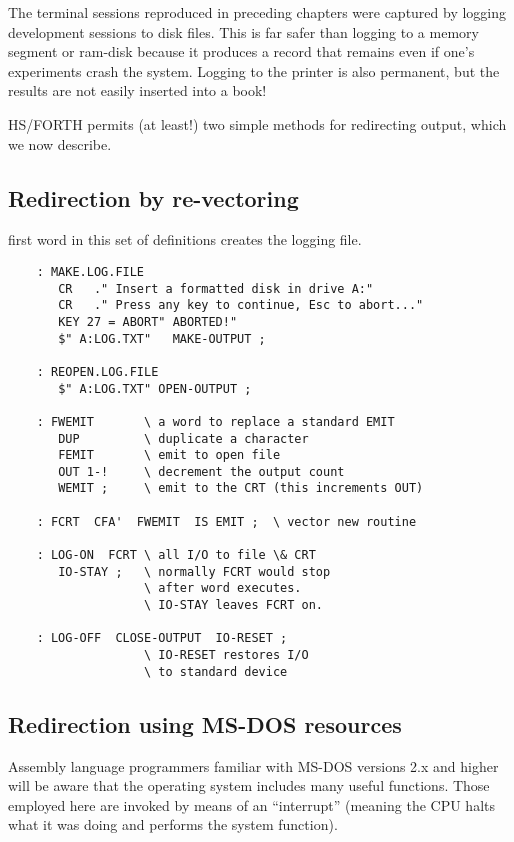 The terminal sessions reproduced in preceding chapters were captured by logging development sessions to disk files. This is far safer than logging to a memory segment or ram-disk because it produces a record that remains even if one’s experiments crash the system. Logging to the printer is also permanent, but the results are not easily inserted into a book!

HS/FORTH permits (at least!) two simple methods for redirecting output, which we now describe.

\subsection{Redirection by re-vectoring}
 first word in this set of definitions creates the logging file.

\begin{lstlisting}
    : MAKE.LOG.FILE
       CR   ." Insert a formatted disk in drive A:"
       CR   ." Press any key to continue, Esc to abort..."
       KEY 27 = ABORT" ABORTED!"
       $" A:LOG.TXT"   MAKE-OUTPUT ;

    : REOPEN.LOG.FILE
       $" A:LOG.TXT" OPEN-OUTPUT ;

    : FWEMIT       \ a word to replace a standard EMIT
       DUP         \ duplicate a character
       FEMIT       \ emit to open file
       OUT 1-!     \ decrement the output count
       WEMIT ;     \ emit to the CRT (this increments OUT)

    : FCRT  CFA'  FWEMIT  IS EMIT ;  \ vector new routine

    : LOG-ON  FCRT \ all I/O to file \& CRT
       IO-STAY ;   \ normally FCRT would stop
                   \ after word executes.
                   \ IO-STAY leaves FCRT on.

    : LOG-OFF  CLOSE-OUTPUT  IO-RESET ;
                   \ IO-RESET restores I/O
                   \ to standard device
\end{lstlisting}

\subsection{Redirection using MS-DOS resources}

Assembly language programmers familiar with MS-DOS versions 2.x and higher will be aware that the operating system includes many useful functions. Those employed here are invoked by means of an ``interrupt'' (meaning the CPU halts what it was doing and performs the system function).

